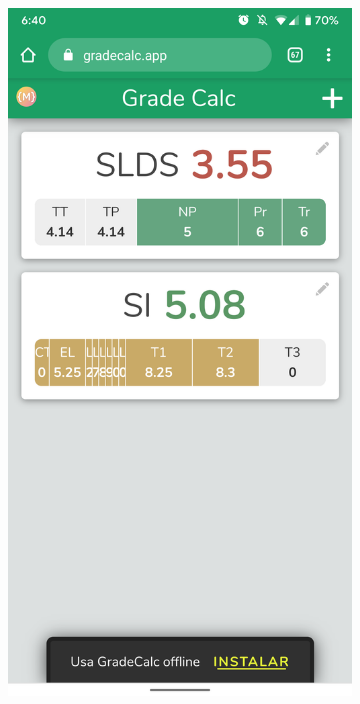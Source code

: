 \vfill
\begin{figure}[ht!]
    \begin{subfigure}[b]{0.25\textwidth-0.1cm}
        \centering
        \includegraphics[width=\textwidth]{media/screenshots/screenshot-install-banner.png}

\end{subfigure}
\end{figure}
